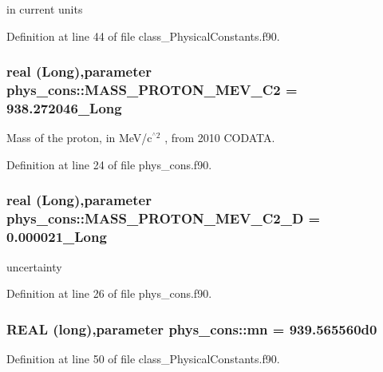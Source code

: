 in current units 



Definition at line 44 of file class\_\-PhysicalConstants.f90.

\hypertarget{namespacephys__cons_a3460d18828c87b266ab35b1cdeb4a0a5}{
\subsubsection[{MASS\_\-PROTON\_\-MEV\_\-C2}]{\setlength{\rightskip}{0pt plus 5cm}real (Long),parameter {\bf phys\_\-cons::MASS\_\-PROTON\_\-MEV\_\-C2} = 938.272046\_\-Long}}
\label{namespacephys__cons_a3460d18828c87b266ab35b1cdeb4a0a5}


Mass of the proton, in MeV/c$^{\mbox{$^\wedge$2}}$ , from 2010 CODATA. 



Definition at line 24 of file phys\_\-cons.f90.

\hypertarget{namespacephys__cons_a3299e2ce8c6c720ed740eff7968b27a8}{
\subsubsection[{MASS\_\-PROTON\_\-MEV\_\-C2\_\-D}]{\setlength{\rightskip}{0pt plus 5cm}real (Long),parameter {\bf phys\_\-cons::MASS\_\-PROTON\_\-MEV\_\-C2\_\-D} = 0.000021\_\-Long}}
\label{namespacephys__cons_a3299e2ce8c6c720ed740eff7968b27a8}


uncertainty 



Definition at line 26 of file phys\_\-cons.f90.

\hypertarget{namespacephys__cons_ad68aaba74b75e1e13f1367c1eb0904c1}{
\subsubsection[{mn}]{\setlength{\rightskip}{0pt plus 5cm}REAL (long),parameter {\bf phys\_\-cons::mn} = 939.565560d0}}
\label{namespacephys__cons_ad68aaba74b75e1e13f1367c1eb0904c1}


Definition at line 50 of file class\_\-PhysicalConstants.f90.

